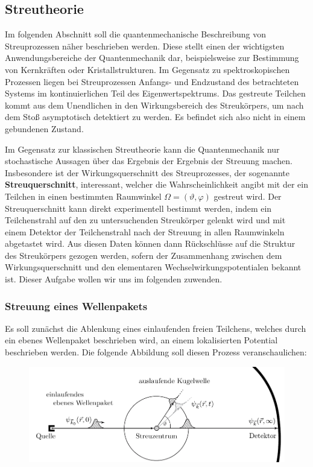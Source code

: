 %
%
%

\subsection{Streutheorie}
Im folgenden Abschnitt soll die quantenmechanische Beschreibung von Streuprozessen näher beschrieben werden. Diese stellt einen der wichtigsten Anwendungsbereiche der Quantenmechanik dar, beispielsweise zur Bestimmung von Kernkräften oder Kristallstrukturen. Im Gegensatz  zu spektroskopischen Prozessen liegen bei Streuprozessen Anfangs- und Endzustand des betrachteten Systems im kontinuierlichen Teil des Eigenwertspektrums. Das gestreute Teilchen kommt aus dem Unendlichen in den Wirkungsbereich des Streukörpers, um nach dem Stoß asymptotisch detektiert zu werden. Es befindet sich also nicht in einem gebundenen Zustand. 

Im Gegensatz zur klassischen Streutheorie kann die Quantenmechanik nur  stochastische Aussagen über das Ergebnis der Ergebnis der Streuung machen. Insbesondere ist der Wirkungsquerschnitt des Streuprozesses, der sogenannte {\bf Streuquerschnitt}, interessant, welcher die Wahrscheinlichkeit angibt mit der ein Teilchen in einen bestimmten Raumwinkel $\Omega=(\vartheta,\varphi)$ gestreut wird. Der Streuquerschnitt kann direkt experimentell bestimmt werden, indem ein Teilchenstrahl auf den zu untersuchenden Streukörper gelenkt wird und mit einem Detektor der Teilchenstrahl nach der Streuung in allen Raumwinkeln abgetastet wird. Aus diesen Daten können dann Rückschlüsse auf die Struktur des Streukörpers gezogen werden, sofern der Zusammenhang zwischen dem Wirkungsquerschnitt und den elementaren Wechselwirkungspotentialen bekannt ist. Dieser Aufgabe wollen wir uns im folgenden zuwenden. 


\subsubsection{Streuung eines Wellenpakets}

Es soll zunächst die Ablenkung eines einlaufenden freien Teilchens, welches durch ein ebenes Wellenpaket beschrieben wird, an einem lokalisierten Potential beschrieben werden. Die folgende Abbildung soll diesen Prozess veranschaulichen: 
\vspace{-2ex}\begin{figure}[!h]\center
	\includegraphics[scale=1]{Figs/Streuung}
\end{figure}\vspace{-4ex} 

